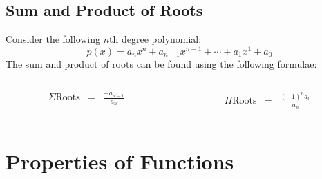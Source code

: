 \documentclass{beamer}
\begin{document}
    \subsection{Sum and Product of Roots}
    \begin{frame}
        Consider the following $n$th degree polynomial:
        $$
            p(x) = a_{n}x^n + a_{n-1}x^{n-1} + \cdots + a_{1}x^{1} + a_0
        $$
        The sum and product of roots can be found using the following formulae:
        \begin{columns}
            \begin{column}{.5\textwidth}
                \begin{eqnarray*}
                    \Sigma\text{Roots} & = & \frac{-a_{n-1}}{a_n}
                \end{eqnarray*}
            \end{column}
            \begin{column}{.5\textwidth}
                \begin{eqnarray*}
                    \Pi\text{Roots} & = & \frac{(-1)^{n}a_0}{a_n}
                \end{eqnarray*}
            \end{column}
        \end{columns}
    \end{frame}
    \section{Properties of Functions}
\end{document}
